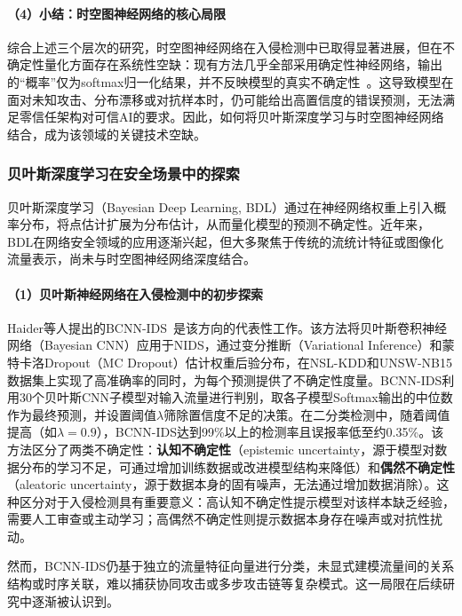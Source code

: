 \paragraph{（4）小结：时空图神经网络的核心局限}

综合上述三个层次的研究，时空图神经网络在入侵检测中已取得显著进展，但在不确定性量化方面存在系统性空缺：现有方法几乎全部采用确定性神经网络，输出的``概率''仅为softmax归一化结果，并不反映模型的真实不确定性~\cite{BCNN-IDS,Tabarisaadi2024}。这导致模型在面对未知攻击、分布漂移或对抗样本时，仍可能给出高置信度的错误预测，无法满足零信任架构对可信AI的要求。因此，如何将贝叶斯深度学习与时空图神经网络结合，成为该领域的关键技术空缺。


\subsubsection{贝叶斯深度学习在安全场景中的探索}

贝叶斯深度学习（Bayesian Deep Learning, BDL）通过在神经网络权重上引入概率分布，将点估计扩展为分布估计，从而量化模型的预测不确定性。近年来，BDL在网络安全领域的应用逐渐兴起，但大多聚焦于传统的流统计特征或图像化流量表示，尚未与时空图神经网络深度结合。

\paragraph{（1）贝叶斯神经网络在入侵检测中的初步探索}

Haider等人提出的BCNN-IDS~\cite{BCNN-IDS}是该方向的代表性工作。该方法将贝叶斯卷积神经网络（Bayesian CNN）应用于NIDS，通过变分推断（Variational Inference）和蒙特卡洛Dropout（MC Dropout）估计权重后验分布，在NSL-KDD和UNSW-NB15数据集上实现了高准确率的同时，为每个预测提供了不确定性度量。BCNN-IDS利用30个贝叶斯CNN子模型对输入流量进行判别，取各子模型Softmax输出的中位数作为最终预测，并设置阈值$\lambda$筛除置信度不足的决策。在二分类检测中，随着阈值提高（如$\lambda=0.9$），BCNN-IDS达到99\%以上的检测率且误报率低至约0.35\%。该方法区分了两类不确定性：\textbf{认知不确定性}（epistemic uncertainty，源于模型对数据分布的学习不足，可通过增加训练数据或改进模型结构来降低）和\textbf{偶然不确定性}（aleatoric uncertainty，源于数据本身的固有噪声，无法通过增加数据消除）。这种区分对于入侵检测具有重要意义：高认知不确定性提示模型对该样本缺乏经验，需要人工审查或主动学习；高偶然不确定性则提示数据本身存在噪声或对抗性扰动。

然而，BCNN-IDS仍基于独立的流量特征向量进行分类，未显式建模流量间的关系结构或时序关联，难以捕获协同攻击或多步攻击链等复杂模式。这一局限在后续研究中逐渐被认识到。

